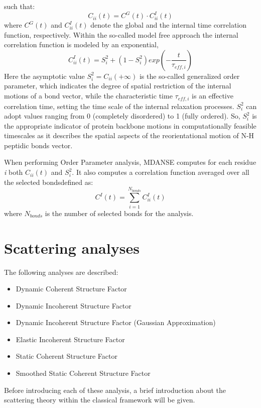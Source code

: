 \documentclass[a4paper,11pt]{article}
\begin{document}
such that:
\begin{equation}
C_{ii}(t) = C^G(t) \cdot C^I_{ii}(t)
\end{equation}
where $C^G(t)$ and $C^I_{ii}(t)$ denote the global and the internal time correlation function, respectively. Within
the so-called model free approach \cite{Szabo:1982,Szabo:1982bis} the internal correlation function is modeled by an
exponential,
\begin{equation}
C^I_{ii}(t) = S^2_i +(1 - S^2_i)exp\left(-\frac{t}{\tau_{eff,i}}\right)
\end{equation}
Here the asymptotic value $S^2_i =C_{ii}(+\infty)$ is the so-called generalized order parameter, which indicates the
degree of spatial restriction of the internal motions of a bond vector, while the characteristic time $\tau_{eff,i}$ is an
effective correlation time, setting the time scale of the internal relaxation processes. $S^2_i$ can adopt values ranging from
0 (completely disordered) to 1 (fully ordered). So, $S^2_i$ is the appropriate indicator of protein backbone motions in
computationally feasible timescales as it describes the spatial aspects of the reorientational motion of N-H peptidic
bonds vector.

When performing Order Parameter analysis, \gls{MDANSE} computes for each residue \textit{i} both $C_{ii}(t)$ and $S^2_i$.
It also computes a correlation function averaged over all the selected bondsdefined as:
\begin{equation}
\label{eq:op_cii_avg}
C^I(t) = \sum\limits_{i = 1}^{N_{bonds}} C^I_{ii}(t)
\end{equation}
where $N_{bonds}$ is the number of selected bonds for the analysis.

\section{Scattering analyses}
\label{scattering_menu}
The following analyses are described:
\begin{itemize}
\item Dynamic Coherent Structure Factor
\item Dynamic Incoherent Structure Factor
\item Dynamic Incoherent Structure Factor (Gaussian Approximation)
\item Elastic Incoherent Structure Factor
\item Static Coherent Structure Factor
\item Smoothed Static Coherent Structure Factor
\end{itemize}
Before introducing each of these analysis, a brief introduction about the scattering theory within the classical framework will be given.
\end{document}
